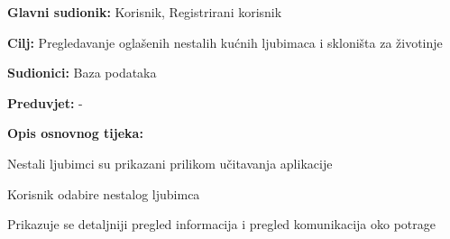 					\noindent {}
					\begin{packed_item}
	
						\item \textbf{Glavni sudionik: }Korisnik, Registrirani korisnik
						\item  \textbf{Cilj:} Pregledavanje oglašenih nestalih kućnih ljubimaca i skloništa za životinje
						\item  \textbf{Sudionici:} Baza podataka
						\item  \textbf{Preduvjet:} -
						\item  \textbf{Opis osnovnog tijeka:}
						
						\item[] \begin{packed_enum}
	
							\item Nestali ljubimci su prikazani prilikom učitavanja aplikacije
							\item Korisnik odabire nestalog ljubimca
							\item Prikazuje se detaljniji pregled informacija i pregled komunikacija oko potrage
						\end{packed_enum}
						
					\end{packed_item}
				
